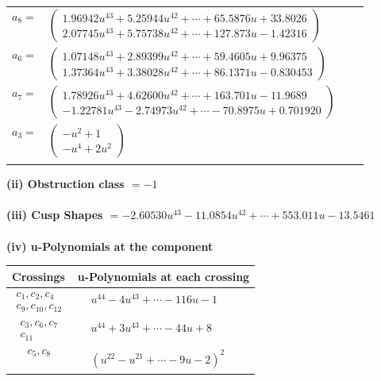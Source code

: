 \documentclass[1p]{elsarticle_modified}
\theoremstyle{definition}
\begin{document}
\begin{tabular}{m{7pt} m{180pt} m{7pt} m{180pt} }
\flushright $a_{8}=$&$\begin{pmatrix}1.96942 u^{43}+5.25944 u^{42}+\cdots+65.5876 u+33.8026\\2.07745 u^{43}+5.75738 u^{42}+\cdots+127.873 u-1.42316\end{pmatrix}$ \\
\flushright $a_{6}=$&$\begin{pmatrix}1.07148 u^{43}+2.89399 u^{42}+\cdots+59.4605 u+9.96375\\1.37364 u^{43}+3.38028 u^{42}+\cdots+86.1371 u-0.830453\end{pmatrix}$ \\
\flushright $a_{7}=$&$\begin{pmatrix}1.78926 u^{43}+4.62600 u^{42}+\cdots+163.701 u-11.9689\\-1.22781 u^{43}-2.74973 u^{42}+\cdots-70.8975 u+0.701920\end{pmatrix}$ \\
\flushright $a_{3}=$&$\begin{pmatrix}- u^2+1\\- u^4+2 u^2\end{pmatrix}$\\&\end{tabular}
\flushleft \textbf{(ii) Obstruction class $= -1$}\\~\\
\flushleft \textbf{(iii) Cusp Shapes $= -2.60530 u^{43}-11.0854 u^{42}+\cdots+553.011 u-13.5461$}\\~\\
\newpage\renewcommand{\arraystretch}{1}
\flushleft \textbf{(iv) u-Polynomials at the component}\newline \\
\begin{tabular}{m{50pt}|m{274pt}}
Crossings & \hspace{64pt}u-Polynomials at each crossing \\
\hline $$\begin{aligned}c_{1},c_{2},c_{4}\\c_{9},c_{10},c_{12}\end{aligned}$$&$\begin{aligned}
&u^{44}-4 u^{43}+\cdots-116 u-1
\end{aligned}$\\
\hline $$\begin{aligned}c_{3},c_{6},c_{7}\\c_{11}\end{aligned}$$&$\begin{aligned}
&u^{44}+3 u^{43}+\cdots-44 u+8
\end{aligned}$\\
\hline $$\begin{aligned}c_{5},c_{8}\end{aligned}$$&$\begin{aligned}
&(u^{22}- u^{21}+\cdots-9 u-2)^{2}
\end{aligned}$\\
\hline
\end{tabular}\\~\\
\end{document}

